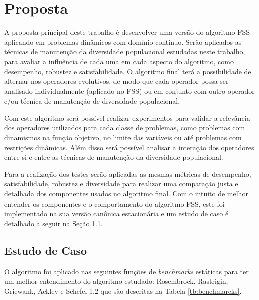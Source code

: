 \chapter{Proposta}
\label{ch:proposta}

A proposta principal deste trabalho é desenvolver uma versão do algoritmo FSS aplicando em problemas dinâmicos com domínio contínuo. Serão aplicados as técnicas de manutenção da diversidade populacional estudadas neste trabalho, para avaliar a influência de cada uma em cada aspecto do algoritmo, como desempenho, robustez e satisfabilidade. O algoritmo final terá a possibilidade de alternar nos operadores evolutivos, de modo que cada operador possa ser analisado individualmente (aplicado no FSS) ou em conjunto com outro operador e/ou técnica de manutenção de diversidade populacional.

Com este algoritmo será possível realizar experimentos para validar a relevância dos operadores utilizados para cada classe de problemas, como problemas com dinamismos na função objetivo, no limite das variáveis ou até problemas com restrições dinâmicas. Além disso será possível analisar a interação dos operadores entre si e entre as técnicas de manutenção da diversidade populacional.

Para a realização dos testes serão aplicadas as mesmas métricas de desempenho, satisfabilidade, robustez e diversidade para realizar uma comparação justa e detalhada dos componentes usados no algoritmo final. Com o intuito de melhor entender os componentes e o comportamento do algoritmo FSS, este foi implementado na sua versão canônica estacionária e um estudo de caso é detalhado a seguir na Seção \ref{sec:test_case}.

\section{Estudo de Caso}
\label{sec:test_case}

O algoritmo foi aplicado nas seguintes funções de \textit{benchmarks} estáticas para ter um melhor entendimento do algoritmo estudado: Rosembrock, Rastrigin, Griewank, Ackley e Schefel 1.2 que são descritas na Tabela \ref{tb:benchmarcks}.

